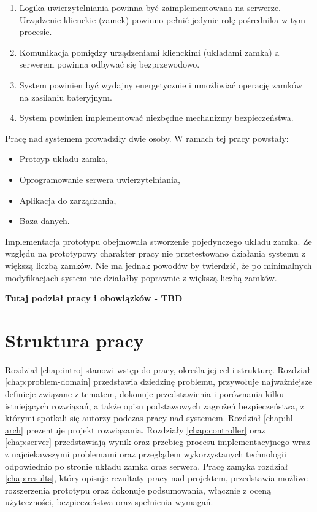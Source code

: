 		\begin{enumerate}
		    \item Logika uwierzytelniania powinna być zaimplementowana na serwerze. Urządzenie klienckie (zamek) powinno pełnić jedynie rolę pośrednika w tym procesie.
		    \item Komunikacja pomiędzy urządzeniami klienckimi (układami zamka) a serwerem powinna odbywać się bezprzewodowo.
		    \item System powinien być wydajny energetycznie i umożliwiać operację zamków na zasilaniu bateryjnym.
		    \item System powinien implementować niezbędne mechanizmy bezpieczeństwa.
		\end{enumerate}

		Pracę nad systemem prowadziły dwie osoby. W ramach tej pracy powstały:
		\begin{itemize}
		    \item Protoyp układu zamka,
		    \item Oprogramowanie serwera uwierzytelniania,
		    \item Aplikacja do zarządzania,
		    \item Baza danych.
		\end{itemize}

		Implementacja prototypu obejmowała stworzenie pojedynczego układu zamka. Ze względu na prototypowy charakter pracy nie przetestowano działania systemu z większą liczbą zamków. Nie ma jednak powodów by twierdzić, że po minimalnych modyfikacjach system nie działałby poprawnie z większą liczbą zamków.

		\textbf{Tutaj podział pracy i obowiązków - TBD}

	\section{Struktura pracy}

		Rozdział \ref{chap:intro} stanowi wstęp do pracy, określa jej cel i strukturę. Rozdział \ref{chap:problem-domain} przedstawia dziedzinę problemu, przywołuje najważniejsze definicje związane z tematem, dokonuje przedstawienia i porównania kilku istniejących rozwiązań, a także opisu podstawowych zagrożeń bezpieczeństwa, z którymi spotkali się autorzy podczas pracy nad systemem. Rozdział \ref{chap:hl-arch} prezentuje projekt rozwiązania. Rozdziały \ref{chap:controller} oraz \ref{chap:server} przedstawiają wynik oraz przebieg procesu implementacyjnego wraz z najciekawszymi problemami oraz przeglądem wykorzystanych technologii odpowiednio po stronie układu zamka oraz serwera. Pracę zamyka rozdział \ref{chap:results}, który opisuje rezultaty pracy nad projektem, przedstawia możliwe rozszerzenia prototypu oraz dokonuje podsumowania, włącznie z oceną użyteczności, bezpieczeństwa oraz spełnienia wymagań.
